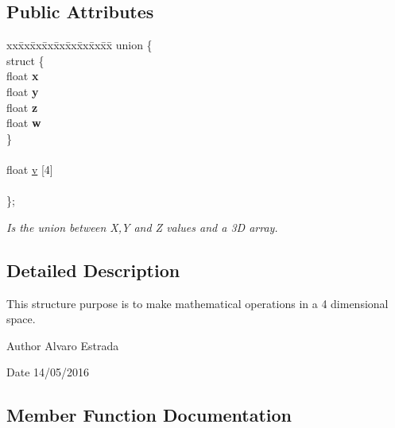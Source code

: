 \subsection*{Public Attributes}
\begin{DoxyCompactItemize}
\item 
\begin{tabbing}
xx\=xx\=xx\=xx\=xx\=xx\=xx\=xx\=xx\=\kill
union \{\\
\>struct \{\\
\>\>float {\bfseries x}\\
\>\>float {\bfseries y}\\
\>\>float {\bfseries z}\\
\>\>float {\bfseries w}\\
\>\} \hypertarget{unionae_core_1_1ae_vector4_1_1_0D30_a1fc99e9c9f46126496f0c0c2b93c14d5}{}\label{unionae_core_1_1ae_vector4_1_1_0D30_a1fc99e9c9f46126496f0c0c2b93c14d5}
\\
\>\>\\
\>float \hyperlink{structae_core_1_1ae_vector4_a37adb8efd339278e6e9c7c019b15336c}{v} \mbox{[}4\mbox{]}\\
\>\>\\
\}; \hypertarget{structae_core_1_1ae_vector4_a9acdabb2625e1909ce7d77d1d56a547c}{}\label{structae_core_1_1ae_vector4_a9acdabb2625e1909ce7d77d1d56a547c}
\\

\end{tabbing}\begin{DoxyCompactList}\small\item\em Is the union between X,Y and Z values and a 3D array. \end{DoxyCompactList}\end{DoxyCompactItemize}


\subsection{Detailed Description}
This structure purpose is to make mathematical operations in a 4 dimensional space. 

\begin{DoxyAuthor}{Author}
Alvaro Estrada 
\end{DoxyAuthor}
\begin{DoxyDate}{Date}
14/05/2016 
\end{DoxyDate}


\subsection{Member Function Documentation}
